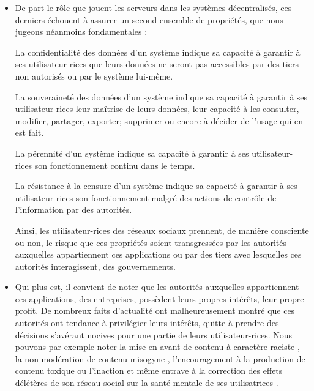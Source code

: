 \begin{itemize}
    \item De part le rôle que jouent les serveurs dans les systèmes décentralisés, ces derniers échouent à assurer un second ensemble de propriétés, que nous jugeons néanmoins fondamentales :
      \begin{definition}
        \label{def:confidentialite}
        La confidentialité des données d'un système indique sa capacité à garantir à ses utilisateur-rices que leurs données ne seront pas accessibles par des tiers non autorisés ou par le système lui-même.
      \end{definition}
      \begin{definition}
        \label{def:souverainete}
        La souveraineté des données d'un système indique sa capacité à garantir à ses utilisateur-rices leur maîtrise de leurs données, \ie leur capacité à les consulter, modifier, partager, exporter; supprimer ou encore à décider de l'usage qui en est fait.
      \end{definition}
      \begin{definition}[Pérennité]
        \label{def:perennite}
        La pérennité d'un système indique sa capacité à garantir à ses utilisateur-rices son fonctionnement continu dans le temps.
      \end{definition}
      \begin{definition}
        \label{def:censorship}
        La résistance à la censure d'un système indique sa capacité à garantir à ses utilisateur-rices son fonctionnement malgré des actions de contrôle de l'information par des autorités.
      \end{definition}
      Ainsi, les utilisateur-rices des réseaux sociaux prennent, de manière consciente ou non, le risque que ces propriétés soient transgressées par les autorités auxquelles appartiennent ces applications ou par des tiers avec lesquelles ces autorités interagissent, \eg des gouvernements.
    \item Qui plus est, il convient de noter que les autorités auxquelles appartiennent ces applications, \eg des entreprises, possèdent leurs propres intérêts, \eg leur propre profit.
      De nombreux faits d'actualité ont malheureusement montré que ces autorités ont tendance à privilégier leurs intérêts, quitte à prendre des décisions s'avérant nocives pour une partie de leurs utilisateur-rices.
      Nous pouvons par exemple noter la mise en avant de contenu à caractère raciste \cite{2018-algorithms-oppression-noble}, la non-modération de contenu misogyne \cite{2018-violence-abuse-against-women-amnesty}, l'encouragement à la production de contenu toxique \cite{2021-facebook-files-algorithm-favoring-toxicity-wsj} ou l'inaction et même entrave à la correction des effets délétères de son réseau social sur la santé mentale de ses utilisatrices \cite{2021-facebook-files-instagram-toxic-teen-girls-wsj}.

\end{itemize}
